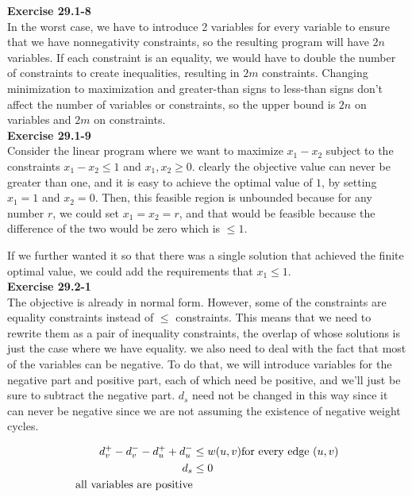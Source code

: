 \documentclass{article}
\begin{document}
\noindent\textbf{Exercise 29.1-8}\\

In the worst case, we have to introduce 2 variables for every variable to ensure that we have nonnegativity constraints, so the resulting program will have $2n$ variables.  If each constraint is an equality, we would have to double the number of constraints to create inequalities, resulting in $2m$ constraints.  Changing minimization to maximization and greater-than signs to less-than signs don't affect the number of variables or constraints, so the upper bound is $2n$ on variables and $2m$ on constraints. \\

\noindent\textbf{Exercise 29.1-9}\\

Consider the linear program where we want to maximize $x_1-x_2$ subject to the constraints $x_1-x_2 \le 1$ and $x_1,x_2\ge 0$. clearly the objective value can never be greater than one, and it is easy to achieve the optimal value of $1$, by setting $x_1 = 1$ and $x_2 = 0$. Then, this feasible region is unbounded because for any number $r$, we could set $x_1 = x_2 =r$, and that would be feasible because the difference of the two would be zero which is $\le 1$.

If we further wanted it so that there was a single solution that achieved the finite optimal value, we could add the requirements that $x_1 \le 1$.\\



\noindent\textbf{Exercise 29.2-1}\\

The objective is already in normal form. However, some of the constraints are equality constraints instead of $\le$ constraints. This means that we need to rewrite them as a pair of inequality constraints, the overlap of whose solutions is just the case where we have equality. we also need to deal with the fact that most of the variables can be negative. To do that, we will introduce variables for the negative part and positive part, each of which need be positive, and we'll just be sure to subtract the negative part. $d_s$ need not be changed in this way since it can never be negative since we are not assuming the existence of negative weight cycles.

\begin{align*}
d_v^+- d_v^- - d_u^+ +d_u^- &\le w(u,v) \hbox{for every edge $(u,v)$}\\
d_s &\le 0\\
\hbox{all variables are positive}
\end{align*}
\end{document}
